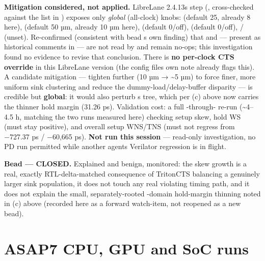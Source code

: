 \begin{record}
\textbf{Mitigation considered, not applied.} LibreLane
2.4.13\textquotesingle s  step
(, cross-checked against the
 list in )
exposes only \emph{global} (all-clock) knobs:
 (default 25, already 8 here),
 (default 50 µm, already 10 µm
here),  (default 0/off),
 (default 0/off),
/ (unset). Re-confirmed (consistent
with bead \textquotesingle s own finding) that
 and  --- present
as historical comments in 
--- are not read by  and remain no-ops; this investigation
found no evidence to revise that conclusion. There is \textbf{no
per-clock CTS override} in this LibreLane version (the config
file\textquotesingle s own  note already flags
this). A candidate mitigation --- tighten
 further (10 µm →
\textasciitilde5 µm) to force finer, more uniform sink clustering and
reduce the dummy-load/\allowbreak{}delay-buffer disparity --- is
credible but \textbf{global}: it would also perturb
\textquotesingle s tree, which per (c) above now carries
the thinner hold margin (31.26 ps). Validation cost: a full
-through- re-run (\textasciitilde4--4.5 h,
matching the two runs measured here) checking  setup skew,
 hold WS (must stay positive), and overall setup WNS/TNS
(must not regress from −727.37 ps / −60,665 ps). \textbf{Not run this
session} --- read-only investigation, no PD run permitted while another
agent\textquotesingle s Verilator regression is in flight.

\textbf{Bead  --- CLOSED.} Explained and benign, monitored:
the skew growth is a real, exactly RTL-delta-matched consequence of
TritonCTS balancing a genuinely larger  sink population,
it does not touch any real violating timing path, and it does not
explain the small, separately-rooted -domain hold-margin
thinning noted in (c) above (recorded here as a forward watch-item, not
reopened as a new bead).

\end{record}

\chapter{ASAP7 CPU, GPU and SoC runs}\label{cr:ch:asap7-cpu-gpu-and-soc-runs}

